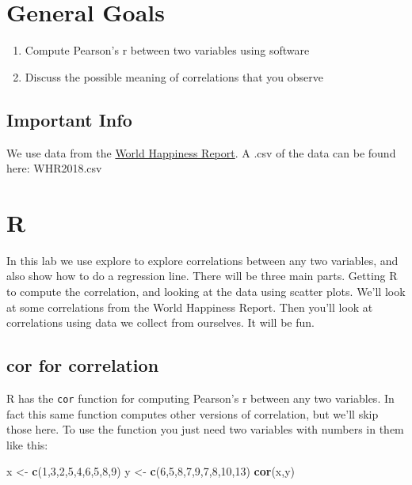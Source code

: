 \documentclass[
]{book}
\newenvironment{Shaded}{\begin{snugshade}}{\end{snugshade}}
\newcommand{\DecValTok}[1]{\textcolor[rgb]{0.00,0.00,0.81}{#1}}
\newcommand{\FunctionTok}[1]{\textcolor[rgb]{0.13,0.29,0.53}{\textbf{#1}}}
\newcommand{\NormalTok}[1]{#1}
\newcommand{\OtherTok}[1]{\textcolor[rgb]{0.56,0.35,0.01}{#1}}
\providecommand{\tightlist}{%
  \setlength{\itemsep}{0pt}\setlength{\parskip}{0pt}}
\begin{document}
\hypertarget{general-goals-2}{%
\section{General Goals}\label{general-goals-2}}

\begin{enumerate}
\def\labelenumi{\arabic{enumi}.}
\tightlist
\item
  Compute Pearson's r between two variables using software
\item
  Discuss the possible meaning of correlations that you observe
\end{enumerate}

\hypertarget{important-info-2}{%
\subsection{Important Info}\label{important-info-2}}

We use data from the \href{http://worldhappiness.report}{World Happiness Report}. A .csv of the data can be found here: WHR2018.csv

\hypertarget{r-3}{%
\section{R}\label{r-3}}

In this lab we use explore to explore correlations between any two variables, and also show how to do a regression line. There will be three main parts. Getting R to compute the correlation, and looking at the data using scatter plots. We'll look at some correlations from the World Happiness Report. Then you'll look at correlations using data we collect from ourselves. It will be fun.

\hypertarget{cor-for-correlation}{%
\subsection{cor for correlation}\label{cor-for-correlation}}

R has the \texttt{cor} function for computing Pearson's r between any two variables. In fact this same function computes other versions of correlation, but we'll skip those here. To use the function you just need two variables with numbers in them like this:

\begin{Shaded}
\begin{Highlighting}[]
\NormalTok{x  }\OtherTok{\textless{}{-}} \FunctionTok{c}\NormalTok{(}\DecValTok{1}\NormalTok{,}\DecValTok{3}\NormalTok{,}\DecValTok{2}\NormalTok{,}\DecValTok{5}\NormalTok{,}\DecValTok{4}\NormalTok{,}\DecValTok{6}\NormalTok{,}\DecValTok{5}\NormalTok{,}\DecValTok{8}\NormalTok{,}\DecValTok{9}\NormalTok{)}
\NormalTok{y  }\OtherTok{\textless{}{-}} \FunctionTok{c}\NormalTok{(}\DecValTok{6}\NormalTok{,}\DecValTok{5}\NormalTok{,}\DecValTok{8}\NormalTok{,}\DecValTok{7}\NormalTok{,}\DecValTok{9}\NormalTok{,}\DecValTok{7}\NormalTok{,}\DecValTok{8}\NormalTok{,}\DecValTok{10}\NormalTok{,}\DecValTok{13}\NormalTok{)}
\FunctionTok{cor}\NormalTok{(x,y)}
\end{Highlighting}
\end{Shaded}
\end{document}
